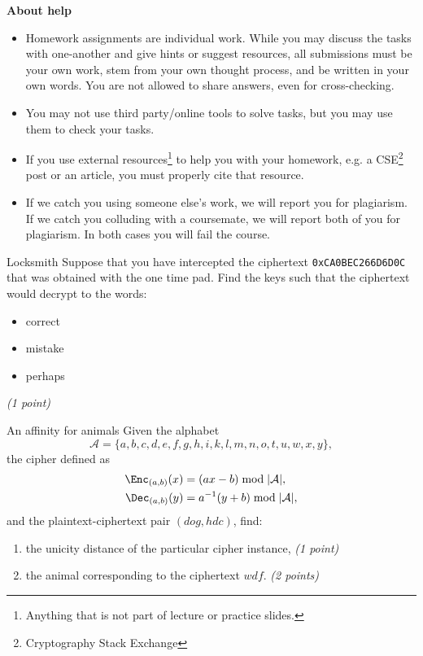 \documentclass{homework}
\begin{document}
\textbf{About help}
\begin{itemize}
  \item Homework assignments are individual work.
  While you may discuss the tasks with one-another and give hints or suggest resources, all submissions must be your own work, stem from your own thought process, and be written in your own words.
  You are not allowed to share answers, even for cross-checking.
  \item You may not use third party/online tools to solve tasks, but you may use them to check your tasks.
  \item If you use external resources\footnote{Anything that is not part of lecture or practice slides.} to help you with your homework, e.g. a CSE\footnote{Cryptography Stack Exchange} post or an article, you must properly cite that resource.
  \item If we catch you using someone else's work, we will report you for plagiarism.
  If we catch you colluding with a coursemate, we will report both of you for plagiarism.
  In both cases you will fail the course.
\end{itemize}

\newpage

\begin{task}{Locksmith}
  Suppose that you have intercepted the ciphertext \texttt{0xCA0BEC266D6D0C} that was obtained with the one time pad.
  Find the keys such that the ciphertext would decrypt to the words:
  \begin{itemize}
    \item correct
    \item mistake
    \item perhaps
  \end{itemize}

  \textit{(1 point)}
\end{task}

\begin{task}{An affinity for animals}
  Given the alphabet
  \[
    \mathcal{A} = \{a, b, c, d, e, f, g, h, i, k, l, m, n, o, t, u, w, x, y\},
  \]
  the cipher defined as
  \begin{align*}
    \Enc_{(a, b)}(x) &= (ax - b) \bmod \lvert\mathcal{A}\rvert,\\
    \Dec_{(a,b)}(y) &= a^{-1}(y + b) \bmod \lvert\mathcal{A}\rvert,
  \end{align*}
  and the plaintext-ciphertext pair $(\mathit{dog},\mathit{hdc})$,
  find:
  \begin{enumerate}
    \item the unicity distance of the particular cipher instance, \textit{(1 point)}
    \item the animal corresponding to the ciphertext $\mathit{wdf}$. \textit{(2 points)}
  \end{enumerate}
\end{task}
\end{document}
